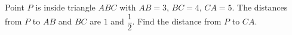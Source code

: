 Point $P$ is inside triangle $ABC$ with $AB=3$, $BC=4$, $CA=5$. The distances from $P$ to $AB$ and $BC$ are $1$ and $\dfrac12$. Find the distance from $P$ to $CA$.
